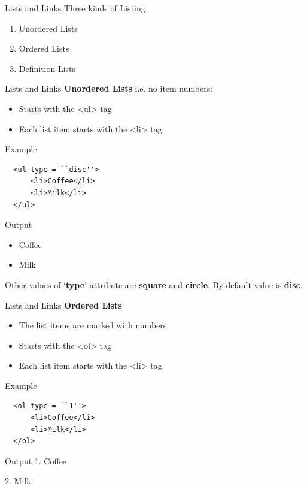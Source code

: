 \documentclass[14pt]{beamer}
\begin{document}
\begin{frame}{Lists and Links}
  Three kinds of Listing
  \begin{enumerate}
   \item Unordered Lists
   \item Ordered Lists
   \item Definition Lists
  \end{enumerate}
\end{frame}

\begin{frame}[fragile]{Lists and Links}
 \textbf{Unordered Lists} i.e. no item numbers:
 \begin{itemize}
  \item Starts with the <ul> tag 
  \item Each list item starts with the <li> tag
 \end{itemize}
 \begin{minipage}{4cm}
 \begin{block}{Example}
 \begin{lstlisting}
  <ul type = ``disc''>
      <li>Coffee</li>
      <li>Milk</li>
  </ul>
  \end{lstlisting}
  \end{block}
 \end{minipage}
\quad
\begin{minipage}{4cm}
\begin{block}{Output}
 \begin{itemize}
  \item Coffee
  \item Milk
 \end{itemize}
\vspace{2pc}
\end{block}
\end{minipage}
Other values of `\textbf{type}' attribute are \textbf{square} and \textbf{circle}. By default value is \textbf{disc}.
\end{frame}

\begin{frame}[fragile]{Lists and Links}
\textbf{Ordered Lists}
\begin{itemize}
 \item The list items are marked with numbers
 \item Starts with the <ol> tag
 \item Each list item starts with the <li> tag
\end{itemize}
\begin{minipage}{4cm}
 \begin{block}{Example}
 \begin{lstlisting}
  <ol type = ``1''>
      <li>Coffee</li>
      <li>Milk</li>
  </ol>
  \end{lstlisting}
  \end{block}
 \end{minipage}
\quad
\begin{minipage}{4cm}
\begin{block}{Output}
 1. Coffee
 
 2. Milk
\vspace{3pc}
\end{block}
\end{minipage}
\end{frame}
\end{document}
